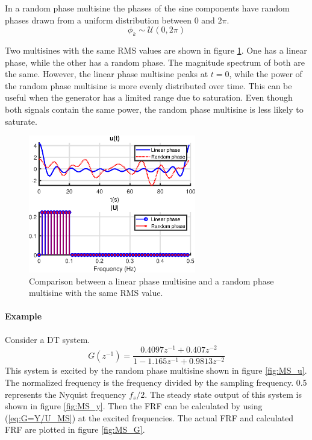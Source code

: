 In a random phase multisine the phases of the sine components have random phases drawn from a uniform distribution between $0$ and $2 \pi$.
\begin{equation*}
    \phi_k \sim \mathcal{U}(0,2\pi)
\end{equation*}

Two multisines with the same RMS values are shown in figure \ref{fig:linear_random_MS_compare}. One has a linear phase, while the other has a random phase. The magnitude spectrum of both are the same. However, the linear phase multisine peaks at $t=0$, while the power of the random phase multisine is more evenly distributed over time. This can be useful when the generator has a limited range due to saturation. Even though both signals contain the same power, the random phase multisine is less likely to saturate.

\begin{figure}[H]
    \centering
    \includegraphics[width = 0.65\textwidth]{figures/MS_u0_u.eps}
    \caption{Comparison between a linear phase multisine and a random phase multisine with the same RMS value.}
    \label{fig:linear_random_MS_compare}
\end{figure}

\newpage
\paragraph{Example}
Consider a DT system.
\begin{equation}
    G(z^{-1}) = \frac{0.4097 z^{-1} + 0.407 z^{-2}}{1 - 1.165 z^{-1} + 0.9813 z^{-2}}
    \label{eq:Gz_example}
\end{equation}
This system is excited by the random phase multisine shown in figure \ref{fig:MS_u}. The normalized frequency is the frequency divided by the sampling frequency. 0.5 represents the Nyquist frequency $f_s/2$. The steady state output of this system is shown in figure \ref{fig:MS_y}. Then the FRF can be calculated by using (\ref{eq:G=Y/U_MS}) at the excited frequencies. The actual FRF and calculated FRF are plotted in figure \ref{fig:MS_G}.

